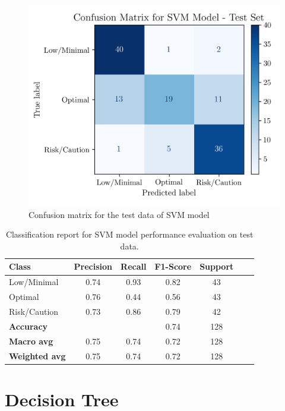 \documentclass[conference]{IEEEtran}
\begin{document}
\begin{figure}[H]
    \centering
    \includegraphics[width=1\linewidth]{assets/SVM_ConfusionMatrixTest.png}
    \caption{Confusion matrix for the test data of SVM model}
    \label{svm_cm_test}
\end{figure} %

\begin{table}[H]
\centering
\caption{Classification report for SVM model performance evaluation on test data.}
\label{crTestSVM}
\begin{tabular}{lcccccc}
\toprule
\textbf{Class} & \textbf{Precision} & \textbf{Recall} & \textbf{F1-Score} & \textbf{Support} \\
\midrule
Low/Minimal & 0.74 & 0.93 & 0.82 & 43 \\
Optimal & 0.76 & 0.44 & 0.56 & 43 \\
Risk/Caution & 0.73 & 0.86 & 0.79 & 42 \\
\midrule
\textbf{Accuracy} &  &  & 0.74 & 128 \\
\textbf{Macro avg} & 0.75 & 0.74 & 0.72 & 128 \\
\textbf{Weighted avg} & 0.75 & 0.74 & 0.72 & 128 \\
\bottomrule
\end{tabular}
\end{table} %

\section{Decision Tree} \label{dtree_section}
\end{document}
